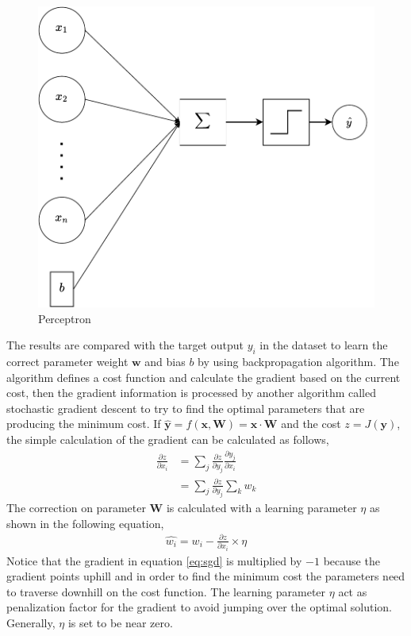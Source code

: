     \begin{figure}
        \centering
        \includegraphics[width=.5\linewidth]{images/perceptron.pdf}
        \caption{Perceptron}
        \label{fig:perceptron}
    \end{figure}
    
    The results are compared with the target output $y_i$ in the
    dataset to learn the correct parameter weight $\mathbf{w}$ and
    bias $b$ by using backpropagation algorithm. The algorithm defines
    a cost function and calculate the gradient based on the current
    cost, then the gradient information is processed by another
    algorithm called stochastic gradient descent to try to find the
    optimal parameters that are producing the minimum cost. If
    $\mathbf{\hat{y}} = f(\mathbf{x}, \mathbf{W}) = \mathbf{x} \cdot
    \mathbf{W}$ and the cost $z = J(\mathbf{y})$, the simple
    calculation of the gradient can be calculated as follows,
    \begin{align}
        \label{eq:gradient1}
        \frac{\partial z}{\partial x_i} &= \sum_j \frac{\partial z}{\partial y_j} \frac{\partial y_j}{\partial x_i}\\
        \label{eq:gradient2}        
        &= \sum_j \frac{\partial z}{\partial y_j} \sum_k w_k
    \end{align}
    The correction on parameter $\mathbf{W}$ is calculated with
    a learning parameter $\eta$ as shown in the following equation,
    \begin{align}
        \label{eq:sgd}
        \hat{w_i} = w_i -\frac{\partial z}{\partial x_i} \times \eta 
    \end{align}
    Notice that the gradient in equation \ref{eq:sgd} is multiplied by
    $-1$ because the gradient points uphill and in order to find the minimum
    cost the parameters need to traverse downhill on the cost
    function. The learning parameter $\eta$ act as penalization factor
    for the gradient to avoid jumping over the optimal solution.
    Generally, $\eta$ is set to be near zero.
    
